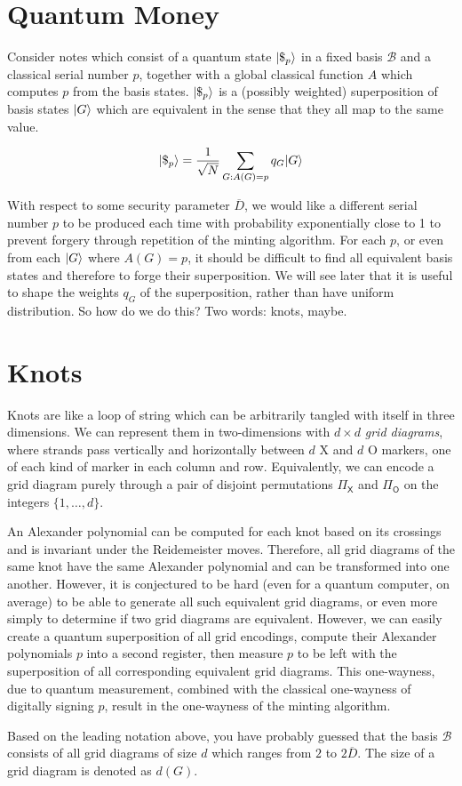 \section{Quantum Money}

Consider notes which consist of a quantum state $|\$_p \rangle$ in
a fixed basis $\mathcal{B}$
and a classical serial number $p$,
together with a global classical function $A$ which computes
$p$ from the basis states. $|\$_p \rangle$ is a (possibly weighted) superposition
of basis states $|G \rangle$ which are equivalent in the sense that they all map
to the same value.

\begin{displaymath}
|\$_p \rangle = \frac{1}{\sqrt{N}} \sum_{G:A(G)=p} q_G |G \rangle
\end{displaymath}

With respect to some security parameter $\overline{D}$, 
we would like a different serial number $p$ to be produced each time
with probability exponentially close to 1 to prevent forgery through
repetition
of the minting algorithm. For each $p$, or even from each $|G \rangle$ where
$A(G)=p$, it should be difficult to find all equivalent basis states and
therefore
to forge their superposition. We will see later that it is useful to
shape the weights $q_G$ of the superposition, rather than have uniform
distribution. So how do we do this? Two words: knots, maybe.

\section{Knots}

Knots are like a loop of string which can be arbitrarily tangled
with
itself in three dimensions. We
can represent them in two-dimensions with $d \times d$
\emph{grid diagrams}, where strands
pass vertically and horizontally between $d$ \textsf{X} and
$d$ \textsf{O} markers,
one of each kind of marker in each column and row.
Equivalently, we can encode a grid diagram purely through
a pair of disjoint permutations $\Pi_{\textsf{X}}$
and $\Pi_{\textsf{O}}$ on the integers $\{1, \ldots, d\}$.

An Alexander polynomial can be computed for each knot based on its
crossings and is invariant under the Reidemeister moves. Therefore,
all grid diagrams of the same knot have the same Alexander polynomial
and can be transformed into one another.
However, it is conjectured to be hard (even for a quantum computer, on
average) to be able to generate all such equivalent
grid diagrams, or even more simply to determine if two grid diagrams are
equivalent. However, we can easily create a quantum
superposition of all grid encodings, compute their Alexander polynomials
$p$ into a second register, then measure $p$ to be left with the
superposition of all corresponding equivalent grid diagrams.
This one-wayness, due to quantum measurement, combined with the classical
one-wayness of digitally signing $p$, result in the one-wayness of
the minting algorithm.

Based on the leading notation above, you have probably guessed that the
basis $\mathcal{B}$ consists of all grid diagrams of size $d$ which ranges
from $2$ to $2\overline{D}$. The size of a grid diagram is
denoted as $d(G)$.